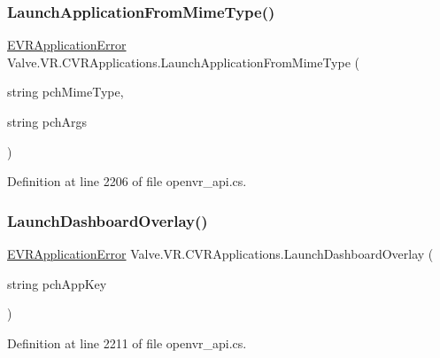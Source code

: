 \subsubsection{\texorpdfstring{LaunchApplicationFromMimeType()}{LaunchApplicationFromMimeType()}}
{\footnotesize\ttfamily \mbox{\hyperlink{namespace_valve_1_1_v_r_a3488adab8a219b579fcee50f4e63a8b6}{E\+V\+R\+Application\+Error}} Valve.\+V\+R.\+C\+V\+R\+Applications.\+Launch\+Application\+From\+Mime\+Type (\begin{DoxyParamCaption}\item[{string}]{pch\+Mime\+Type,  }\item[{string}]{pch\+Args }\end{DoxyParamCaption})}



Definition at line 2206 of file openvr\+\_\+api.\+cs.

\mbox{\label{class_valve_1_1_v_r_1_1_c_v_r_applications_a33117092ab66989cc378f6f41f2fc772}} 
\subsubsection{\texorpdfstring{LaunchDashboardOverlay()}{LaunchDashboardOverlay()}}
{\footnotesize\ttfamily \mbox{\hyperlink{namespace_valve_1_1_v_r_a3488adab8a219b579fcee50f4e63a8b6}{E\+V\+R\+Application\+Error}} Valve.\+V\+R.\+C\+V\+R\+Applications.\+Launch\+Dashboard\+Overlay (\begin{DoxyParamCaption}\item[{string}]{pch\+App\+Key }\end{DoxyParamCaption})}



Definition at line 2211 of file openvr\+\_\+api.\+cs.

\mbox{\label{class_valve_1_1_v_r_1_1_c_v_r_applications_aecc547aa078162f39cc95d6eb7191f0d}} 
